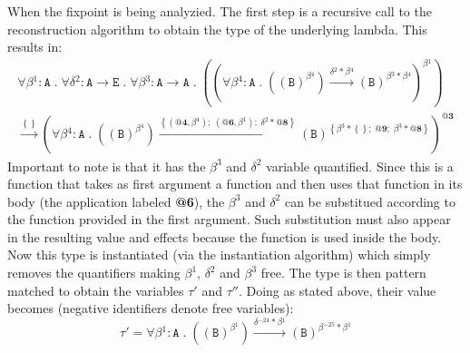 \documentclass[8pt]{extarticle}
\begin{document}
When the fixpoint is being analyzied. The first step is a recursive call to the reconstruction algorithm to obtain the type of the underlying lambda. This results in:
\[
\begin{array}{c}
\forall{}\beta{}^{1}:\mathtt{A}\;{}.\;{}\forall{}\delta{}^{2}:\mathtt{A}\to{}\mathtt{E}\;{}.\;{}\forall{}\beta{}^{3}:\mathtt{A}\to{}\mathtt{A}\;{}.\;{}\left(\left(\forall{}\beta{}^{4}:\mathtt{A}\;{}.\;{}\left(\left(\mathtt{B}\right)^{\beta{}^{4}}\right)\xrightarrow{\delta{}^{2}*\beta{}^{4}}\left(\mathtt{B}\right)^{\beta{}^{3}*\beta{}^{4}}\right)^{\beta{}^{1}}\right)\\
\xrightarrow{\left\{\right\}}\left(\forall{}\beta{}^{4}:\mathtt{A}\;{}.\;{}\left(\left(\mathtt{B}\right)^{\beta{}^{4}}\right)\xrightarrow{\left\{\left(\textbf{@4},\beta{}^{4}\right);\;{}\left(\textbf{@6},\beta{}^{1}\right);\;{}\delta{}^{2}*\textbf{@8}\right\}}\left(\mathtt{B}\right)^{\left\{\beta{}^{3}*\left\{\right\};\;{}\textbf{@9};\;{}\beta{}^{3}*\textbf{@8}\right\}}\right)^{\textbf{@3}}
\end{array}
\]
Important to note is that it has the $\beta^3$ and $\delta^2$ variable quantified. Since this is a function that takes as first argument a function and then uses that function in its body (the application labeled {\bf @6}), the $\beta^3$ and $\delta^2$ can be substitued according to the function provided in the first argument. Such substitution must also appear in the resulting value and effects because the function is used inside the body. Now this type is instantiated (via the instantiation algorithm) which simply removes the quantifiers making $\beta^1$, $\delta^2$ and $\beta^3$ free. The type is then pattern matched to obtain the variables $\tau'$ and $\tau''$. Doing as stated above, their value becomes (negative identifiers denote free variables):
\[
\tau' = \forall{}\beta{}^{1}:\mathtt{A}\;{}.\;{}\left(\left(\mathtt{B}\right)^{\beta{}^{1}}\right)\xrightarrow{\delta{}^{-24}*\beta{}^{1}}\left(\mathtt{B}\right)^{\beta{}^{-25}*\beta{}^{1}}
\]
\end{document}
